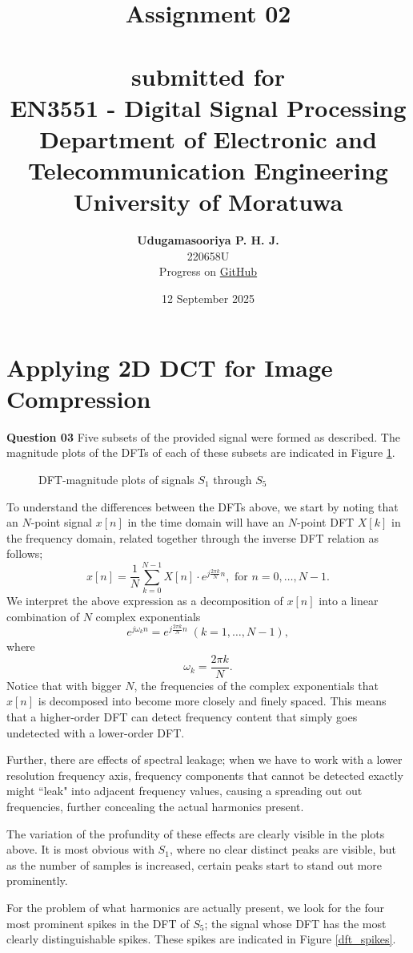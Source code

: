 \documentclass{article}[a4paper]
\title{
	\huge{\textbf{
		Assignment 02
	}}\\
	\large{\phantom{}}\\
	\large{
		submitted for
	}\\
	\Large{
		\textbf{EN3551 - Digital Signal Processing}
	}\\
	\large{
		Department of Electronic and Telecommunication Engineering
	}
	\\
	\large{University of Moratuwa}
}
\author{
	\textbf{Udugamasooriya P. H. J.}\\
	220658U\\
	\small{Progress on \href{https://github.com/pulasthi-u/en3150-assignment02}{GitHub \extlink}}
}
\date{12 September 2025}
\begin{document}
	\maketitle
	
	\section{Applying 2D DCT for Image Compression}
	
	\textbf{Question 03} Five subsets of the provided signal were formed as described. The magnitude plots of the DFTs of each of these subsets are indicated in Figure \ref{subset_dfts}.
	
	\begin{figure}[H]
		\centering
		\caption{DFT-magnitude plots of signals $S_1$ through $S_5$}
		\label{subset_dfts}
	\end{figure}
	
	To understand the differences between the DFTs above, we start by noting that an $N$-point signal $x[n]$ in the time domain will have an $N$-point DFT $X[k]$ in the frequency domain, related together through the inverse DFT relation as follows; \[
		x[n] = \dfrac{1}{N} \sum_{k=0}^{N-1} X[n] \cdot e^{j\frac{2\pi k}{N}n}, \text{ for } n = 0, \dots, N-1.
	\] We interpret the above expression as a decomposition of $x[n]$ into a linear combination of $N$ complex exponentials \[
		e^{j \omega_k n} = e^{j\frac{2\pi k}{N}n} \; (k = 1, \dots, N-1),
	\] where \[
		\omega_k = \frac{2\pi k}{N}.
	\] Notice that with bigger $N$, the frequencies of the complex exponentials that $x[n]$ is decomposed into become more closely and finely spaced. This means that a higher-order DFT can detect frequency content that simply goes undetected with a lower-order DFT.
	
	Further, there are effects of spectral leakage; when we have to work with a lower resolution frequency axis, frequency components that cannot be detected exactly might ``leak" into adjacent frequency values, causing a spreading out out frequencies, further concealing the actual harmonics present.
	
	The variation of the profundity of these effects are clearly visible in the plots above. It is most obvious with $S_1$, where no clear distinct peaks are visible, but as the number of samples is increased, certain peaks start to stand out more prominently.
	
	For the problem of what harmonics are actually present, we look for the four most prominent spikes in the DFT of $S_5$; the signal whose DFT has the most clearly distinguishable spikes. These spikes are indicated in Figure \ref{dft_spikes}.
	
\end{document}
